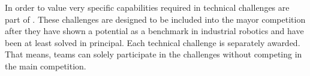 
In order to value very specific capabilities required in \RCAW technical challenges are part of \RCAW.
These challenges are designed to be included into the mayor competition after they have shown a potential as a benchmark in industrial robotics and have been at least solved in principal.
Each technical challenge is separately awarded. That means, teams can solely participate in the challenges without competing in the main competition.



